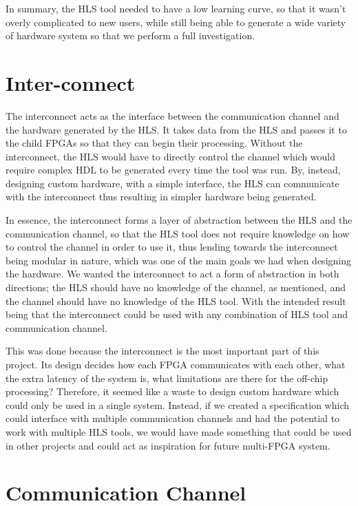 In summary, the HLS tool needed to have a low learning curve, so that it wasn't overly complicated to new users, while still being able to generate a wide variety of hardware system so that we perform a full investigation.

\section{Inter-connect}

The interconnect acts as the interface between the communication channel and the hardware generated by the HLS. It takes data from the HLS and passes it to the child FPGAs so that they can begin their processing. Without the interconnect, the HLS would have to directly control the channel which would require complex HDL to be generated every time the tool was run. By, instead, designing custom hardware, with a simple interface, the HLS can communicate with the interconnect thus resulting in simpler hardware being generated.

In essence, the interconnect forms a layer of abstraction between the HLS and the communication channel, so that the HLS tool does not require knowledge on how to control the channel in order to use it, thus lending towards the interconnect being modular in nature, which was one of the main goals we had when designing the hardware. We wanted the interconnect to act a form of abstraction in both directions; the HLS should have no knowledge of the channel, as mentioned, and the channel should have no knowledge of the HLS tool. With the intended result being that the interconnect could be used with any combination of HLS tool and communication channel.

This was done because the interconnect is the most important part of this project. Its design decides how each FPGA communicates with each other, what the extra latency of the system is, what limitations are there for the off-chip processing? Therefore, it seemed like a waste to design custom hardware which could only be used in a single system. Instead, if we created a specification which could interface with multiple communication channels and had the potential to work with multiple HLS tools, we would have made something that could be used in other projects and could act as inspiration for future multi-FPGA system.

\section{Communication Channel}

